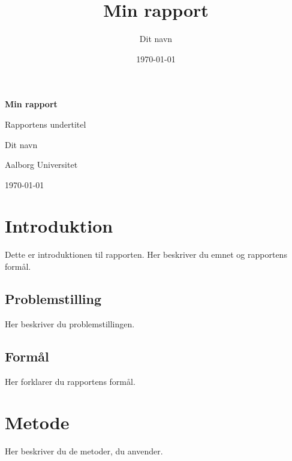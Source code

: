 \documentclass[a4paper,12pt]{article}
\title{Min rapport}
\author{Dit navn}
\date{\today}
\begin{document}
\begin{titlepage}
    \centering

    \vspace*{3cm}

    {\Huge\bfseries Min rapport\par}

    \vspace{1.5cm}

    {\Large Rapportens undertitel\par}

    \vspace{3cm}

    {\large Dit navn\par}

    \vspace{0.5cm}

    {\large Aalborg Universitet\par}

    \vfill

    {\large \today\par}

\end{titlepage}

\tableofcontents
\newpage

\section{Introduktion}

Dette er introduktionen til rapporten.
Her beskriver du emnet og rapportens formål.

\subsection{Problemstilling}

Her beskriver du problemstillingen.

\subsection{Formål}

Her forklarer du rapportens formål.

\section{Metode}

Her beskriver du de metoder, du anvender.
\end{document}
